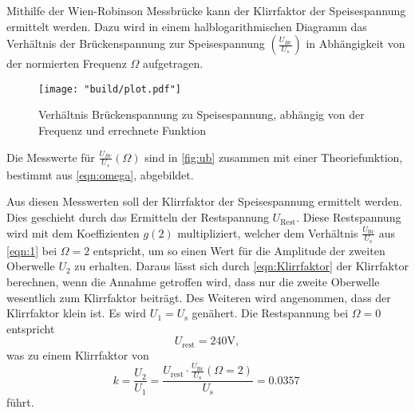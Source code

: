 \noindent Mithilfe der Wien-Robinson Messbrücke kann der Klirrfaktor der Speisespannung 
ermittelt werden. Dazu wird in einem halblogarithmischen Diagramm das
Verhältnis der Brückenspannung zur Speisespannung $(\frac{U_{Br}}{U_s})$ in 
Abhängigkeit von der normierten Frequenz $\Omega$ aufgetragen.
\begin{figure}[H]
       \caption{Verhältnis Brückenspannung zu Speisespannung, abhängig von der Frequenz und errechnete Funktion}
       \label{fig:ub}
       \centering
       \texttt{[image: "build/plot.pdf"]}
\end{figure}
\noindent Die Messwerte für $\frac{U_{Br}}{U_s}\left(\Omega\right)$ sind in
\autoref{fig:ub} zusammen mit einer Theoriefunktion, bestimmt aus
\autoref{eqn:omega}, abgebildet.

\noindent Aus diesen Messwerten soll der Klirrfaktor der Speisespannung ermittelt werden. 
Dies geschieht durch das Ermitteln der Restspannung $U_\text{Rest}$. Diese 
Restspannung wird mit dem Koeffizienten $g(2)$ multipliziert, welcher dem 
Verhältnis $\frac{U_\text{Br}}{U_\text{s}}$ aus \autoref{eqn:1} bei $\Omega = 2$ entspricht, um so 
einen Wert für die Amplitude der zweiten Oberwelle $U_2$ zu erhalten.
Daraus lässt sich durch \autoref{eqn:Klirrfaktor} der Klirrfaktor berechnen,
wenn die Annahme getroffen wird, dass nur die zweite Oberwelle wesentlich zum
Klirrfaktor beiträgt. Des Weiteren wird angenommen, dass der Klirrfaktor klein
ist. Es wird  $U_1 = U_\text{s}$ genähert.
Die Restspannung bei $\Omega = 0 $ entspricht 
\begin{equation*}
       U_\text{rest} = 240 \unit{\volt},
\end{equation*}
was zu einem Klirrfaktor von 
\begin{equation*}
       k = \frac{U_2}{U_1} = \frac{U_\text{rest} \cdot \frac{U_\text{Br}}{U_\text{s}}(\Omega = 2)}{U_\text{s}} = \qty{0.0357}{}
\end{equation*}
führt.